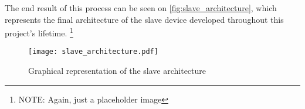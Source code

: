 The end result of this process can be seen on \autoref{fig:slave_architecture}, which represents the final architecture of the slave device developed throughout this project's lifetime. \footnote{NOTE: Again, just a placeholder image}

\begin{figure}[htp]
	\centering
	\texttt{[image: slave\_architecture.pdf]}
	\caption{Graphical representation of the slave architecture}
	\label{fig:slave_architecture}
\end{figure}
